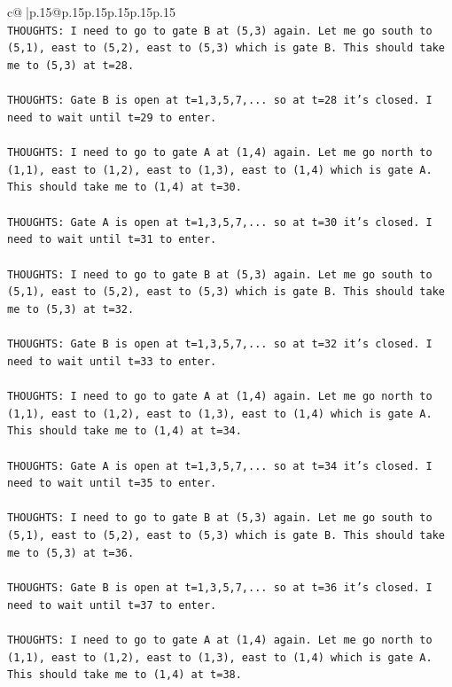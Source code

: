 \documentclass{article}
\begin{document}
{\begin{supertabular}{c@{$\;$}|p{.15\linewidth}@{}p{.15\linewidth}p{.15\linewidth}p{.15\linewidth}p{.15\linewidth}p{.15\linewidth}}
{{{\\ 
\texttt{THOUGHTS: I need to go to gate B at (5,3) again. Let me go south to (5,1), east to (5,2), east to (5,3) which is gate B. This should take me to (5,3) at t=28.} \\
\\ 
\texttt{THOUGHTS: Gate B is open at t=1,3,5,7,... so at t=28 it's closed. I need to wait until t=29 to enter.} \\
\\ 
\texttt{THOUGHTS: I need to go to gate A at (1,4) again. Let me go north to (1,1), east to (1,2), east to (1,3), east to (1,4) which is gate A. This should take me to (1,4) at t=30.} \\
\\ 
\texttt{THOUGHTS: Gate A is open at t=1,3,5,7,... so at t=30 it's closed. I need to wait until t=31 to enter.} \\
\\ 
\texttt{THOUGHTS: I need to go to gate B at (5,3) again. Let me go south to (5,1), east to (5,2), east to (5,3) which is gate B. This should take me to (5,3) at t=32.} \\
\\ 
\texttt{THOUGHTS: Gate B is open at t=1,3,5,7,... so at t=32 it's closed. I need to wait until t=33 to enter.} \\
\\ 
\texttt{THOUGHTS: I need to go to gate A at (1,4) again. Let me go north to (1,1), east to (1,2), east to (1,3), east to (1,4) which is gate A. This should take me to (1,4) at t=34.} \\
\\ 
\texttt{THOUGHTS: Gate A is open at t=1,3,5,7,... so at t=34 it's closed. I need to wait until t=35 to enter.} \\
\\ 
\texttt{THOUGHTS: I need to go to gate B at (5,3) again. Let me go south to (5,1), east to (5,2), east to (5,3) which is gate B. This should take me to (5,3) at t=36.} \\
\\ 
\texttt{THOUGHTS: Gate B is open at t=1,3,5,7,... so at t=36 it's closed. I need to wait until t=37 to enter.} \\
\\ 
\texttt{THOUGHTS: I need to go to gate A at (1,4) again. Let me go north to (1,1), east to (1,2), east to (1,3), east to (1,4) which is gate A. This should take me to (1,4) at t=38.} \\
\\ 
}}}
\end{supertabular}}
\end{document}

